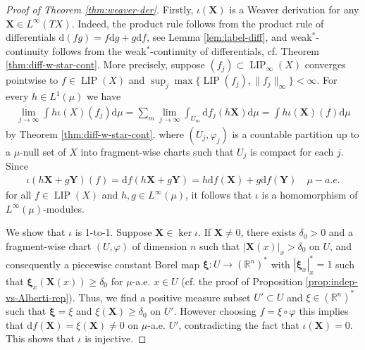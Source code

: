 \documentclass{amsart}
\numberwithin{equation}{section}
\newcommand{\R}{\mathbb{R}}
\newcommand{\LIP}{\operatorname{LIP}}
\newcommand{\ud}{\mathrm {d}}
\begin{document}
\begin{proof}[Proof of Theorem \ref{thm:weaver-der}]
Firstly, $\iota(\bm X)$ is a Weaver derivation for any $\bm X\in L^\infty(TX)$. Indeed, the product rule follows from the product rule of differentials $\ud (fg)=f\ud g+g\ud f$, see Lemma \ref{lem:label-diff}, and weak$^*$-continuity follows from the weak$^*$-continuity of differentials, cf. Theorem \ref{thm:diff-w-star-cont}. More precisely, suppose $(f_j)\subset \LIP_\infty(X)$ converges pointwise to $f\in\LIP(X)$ and $\sup_j\max\{\LIP(f_j),\|f_j\|_\infty\}<\infty$. For every $h\in L^1(\mu)$ we have 
\begin{align*}
	\lim_{j\to \infty}\int h\iota(X)(f_j)\ud \mu=\sum_m\lim_{j\to\infty}\int_{U_m}\ud f_j(h\bm X)\ud\mu=\int h\iota(\bm X)(f)\ud \mu
\end{align*}
by Theorem \ref{thm:diff-w-star-cont}, where $(U_j,\varphi_j)$ is a countable partition up to a $\mu$-null set of $X$ into fragment-wise charts such that $U_j$ is compact for each $j$.
Since 
\begin{align*}
	\iota(h\bm X+g\bm Y)(f)=\ud f(h\bm X+g\bm Y)=h\ud f(\bm X)+g\ud f(\bm Y)\quad \mu-a.e.
\end{align*}
for all $f\in \LIP(X)$ and $h,g\in L^\infty(\mu)$, it follows that $\iota$ is a homomorphism of $L^\infty(\mu)$-modules. 

We show that $\iota$ is 1-to-1. Suppose $\bm X\in \ker\iota$. If $\bm X\ne 0$, there exists $\delta_0>0$ and a fragment-wise chart $(U,\varphi)$ of dimension $n$ such that $|\bm X(x)|_x> \delta_0$ on $U$, and consequently a piecewise constant Borel map $\bm \xi:U\to (\R^n)^*$ with $|\bm \xi_x|_x^*=1$ such that $\bm \xi_x(\bm X(x))\ge \delta_0$ for $\mu$-a.e. $x\in U$ (cf. the proof of Proposition \ref{prop:indep-vs-Alberti-rep}). Thus, we find a positive measure subset $U'\subset U$ and $\xi\in(\R^n)^*$ such that $\bm\xi = \xi$ and $\xi(\bm X)\ge \delta_0$ on $U'$. However choosing $f=\xi\circ\varphi$ this implies that $\ud f(\bm X)=\xi(\bm X)\ne 0$ on $\mu$-a.e. $U'$, contradicting the fact that $\iota(\bm X)=0$. This shows that $\iota$ is injective.


\end{proof}
\end{document}
